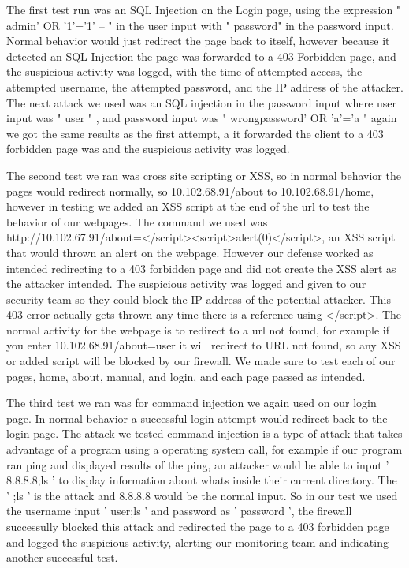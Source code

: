   The first test run was an SQL Injection on the Login page, using the expression " admin' OR '1'='1' -- " in the user input with " password"  in the password input. Normal behavior would just redirect the page back to itself, however because it detected an SQL Injection the page was forwarded to a 403 Forbidden page, and the suspicious activity was logged, with  the time of attempted access, the attempted username, the attempted password, and the IP address of the attacker. The next attack we used was an SQL injection in the password input where user input was " user " , and password input was " wrongpassword' OR 'a'='a " again we got the same results as the first attempt, a it forwarded the client to a 403 forbidden page was and the suspicious activity was logged. 

  The second test we ran was cross site scripting or XSS, so in normal behavior the pages would redirect normally, so 10.102.68.91/about to 10.102.68.91/home, however in testing we added an XSS script at the end of the url to test the behavior of our webpages. The command we used was http://10.102.67.91/about=</script><script>alert(0)</script>, an XSS script that would thrown an alert on the webpage. However our defense worked as intended redirecting to a 403 forbidden page and did not create the XSS alert as the attacker intended. The suspicious activity was logged and given to our security team so they could block the IP address of the potential attacker. This 403 error actually gets thrown any time there is a reference using </script>. The normal activity for the webpage is to redirect to a url not found, for example if you enter 10.102.68.91/about=user it will redirect to URL not found, so any XSS or added script will be blocked by our firewall. We made sure to test each of our pages, home, about, manual, and login, and each page passed as intended.

    The third test we ran was for command injection we again used on our login page. In normal behavior a successful login attempt would redirect back to the login page. The attack we tested command injection is a type of attack that takes advantage of a program using a operating system call, for example if our program ran ping and displayed results of the ping, an attacker would be able to input ' 8.8.8.8;ls ' to display information about whats inside their current directory. The ' ;ls ' is the attack and 8.8.8.8 would be the normal input. So in our test we used the username input ' user;ls ' and password as ' password ', the firewall successully blocked this attack and redirected the page to a 403 forbidden page and logged the suspicious activity, alerting our monitoring team and indicating another successful test. 
